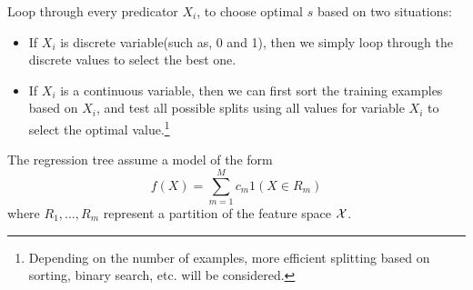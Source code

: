 \begin{refsection}
\begin{remark}
\end{remark}


\begin{remark}
Loop through every predicator $X_i$, to choose optimal $s$ based on two situations:
\begin{itemize}
	\item If $X_i$ is discrete variable(such as, 0 and 1), then we simply loop through the discrete values to select the best one.
	\item If $X_i$ is a continuous variable, then we can first sort the training examples based on $X_i$, and test all possible splits using all values for variable $X_i$ to select the optimal value.\footnote{Depending on the number of examples, more efficient splitting based on sorting, binary search, etc. will be considered.}
\end{itemize}	
\end{remark}



The regression tree assume a model of the form
$$f(X) = \sum_{m=1}^M c_m 1(X\in R_m)$$
where $R_1,...,R_m$ represent a partition of the feature space $\mathcal{X}$.




\end{refsection}
